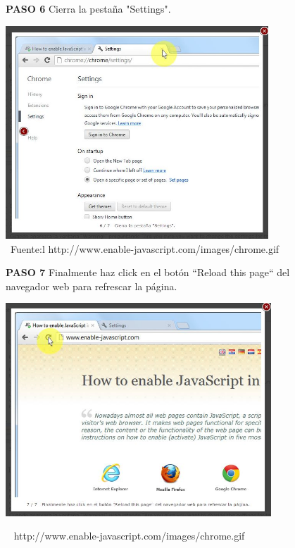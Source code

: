 \documentclass[11pt]{article} %
\begin{document}
\begin{figure}
\begin{center}
\begin{center}
\textbf{ PASO 6 }Cierra la pestaña "Settings".
\end{center}

\includegraphics[height=8cm, width=8 cm] {imagenes/chrome 06.JPG}
\newline
\newline
\  Fuente:l { http://www.enable-javascript.com/images/chrome.gif }


\end{center}
\end{figure}


\begin{figure}
\begin{center}
\begin{center}
\textbf{PASO 7}
Finalmente haz click en el botón ``Reload this page`` del navegador web para refrescar la página.
\newline
\end{center}

\includegraphics[height=8cm, width=8 cm] {imagenes/chrome 07.JPG}
\newline

\  { http://www.enable-javascript.com/images/chrome.gif }
\end{center}
\end{figure}
\end{document}
